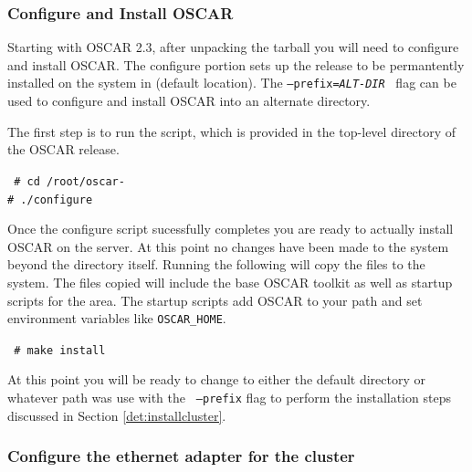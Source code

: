 
\subsubsection{Configure and Install OSCAR}
\label{det:configure-install}

Starting with OSCAR 2.3, after unpacking the tarball you will need to
configure and install OSCAR.  The configure portion sets up the release to
be permantently installed on the system in  (default
location).  The {\tt --prefix=\emph{ALT-DIR}} $\,$ flag can be used to
configure and install OSCAR into an alternate directory.  

The first step is to run the  script, which is provided in
the top-level directory of the OSCAR release.  

  \vspace{11pt} {\tt
          \# cd /root/oscar-\oscarversion \\
  \indent \# ./configure }  \vspace{11pt} 

Once the configure script sucessfully completes you are ready to actually
install OSCAR on the server.  At this point no changes have been made to
the system beyond the  directory itself.  Running
the following will copy the files to the system.  The files copied will
include the base OSCAR toolkit as well as startup scripts for the
 area.  The startup scripts add OSCAR to your path and set
environment variables like {\tt OSCAR\_HOME}.

  \vspace{11pt} {\tt
  \indent \# make install} \vspace{11pt}


At this point you will be ready to change to either the default
 directory or whatever path was use with the {\tt
--prefix} flag to perform the installation steps discussed in Section
\ref{det:installcluster}.



\subsubsection{Configure the ethernet adapter for the cluster} 
\label{det:serveradapter}

